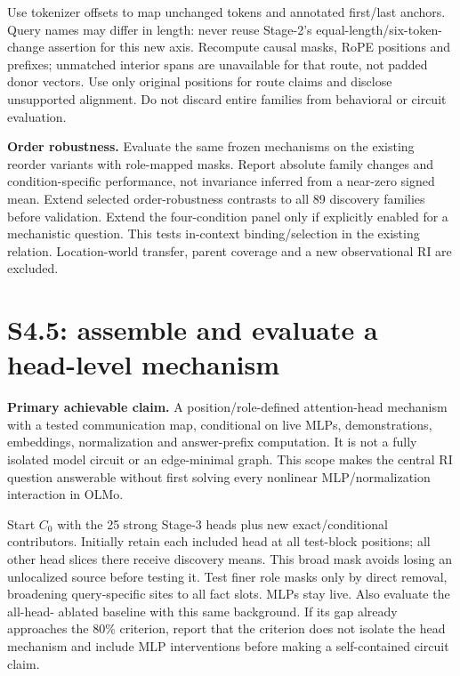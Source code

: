 \documentclass[11pt,a4paper]{article}
\begin{document}
Use tokenizer offsets to map unchanged tokens and annotated first/last anchors.
Query names may differ in length: never reuse Stage-2's equal-length/six-token-change
assertion for this new axis. Recompute causal masks, RoPE positions and prefixes;
unmatched interior spans are unavailable for that route, not padded donor vectors.
Use only original positions for route claims and disclose unsupported alignment.
Do not discard entire families from behavioral or circuit evaluation.

\textbf{Order robustness.} Evaluate the same frozen mechanisms on the existing
reorder variants with role-mapped masks. Report absolute family changes and
condition-specific performance, not invariance inferred from a near-zero signed mean.
Extend selected order-robustness contrasts to all 89 discovery families before validation. Extend the four-condition panel only if explicitly enabled for a mechanistic question.
This tests in-context binding/selection in the existing relation. Location-world
transfer, parent coverage and a new observational RI are excluded.

\section{S4.5: assemble and evaluate a head-level mechanism}
\label{sec:circuit}
\textbf{Primary achievable claim.} A position/role-defined attention-head mechanism
with a tested communication map, conditional on live MLPs, demonstrations, embeddings,
normalization and answer-prefix computation. It is not a fully isolated model circuit
or an edge-minimal graph. This scope makes the central RI question answerable without
first solving every nonlinear MLP/normalization interaction in OLMo.

Start $C_0$ with the 25 strong Stage-3 heads plus new exact/conditional contributors.
Initially retain each included head at all test-block positions; all other head
slices there receive discovery means. This broad mask avoids losing an unlocalized
source before testing it. Test finer role masks only by direct removal, broadening
query-specific sites to all fact slots. MLPs stay live. Also evaluate the all-head-
ablated baseline with this same background. If its gap already approaches the
80\% criterion, report that the criterion does not isolate the head mechanism and
include MLP interventions before making a self-contained circuit claim.
\end{document}
